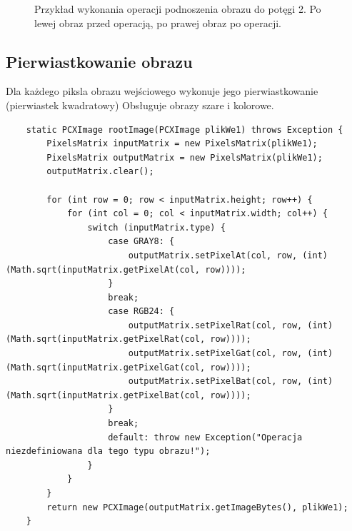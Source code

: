\documentclass{article}
\begin{document}
\begin{figure}[!ht]
	\caption{Przykład wykonania operacji podnoszenia obrazu do potęgi 2. Po lewej obraz przed operacją, po prawej obraz po operacji.}
	\label{fig6}	
	\end{figure}
	
	
	\subsection{Pierwiastkowanie obrazu}
	Dla każdego piksla obrazu wejściowego wykonuje jego pierwiastkowanie (pierwiastek kwadratowy)
	Obsługuje obrazy szare i kolorowe.
	
	\begin{verbatim}
	static PCXImage rootImage(PCXImage plikWe1) throws Exception {
        PixelsMatrix inputMatrix = new PixelsMatrix(plikWe1);
        PixelsMatrix outputMatrix = new PixelsMatrix(plikWe1);
        outputMatrix.clear();
        
        for (int row = 0; row < inputMatrix.height; row++) {
            for (int col = 0; col < inputMatrix.width; col++) {
                switch (inputMatrix.type) {
                    case GRAY8: {
                        outputMatrix.setPixelAt(col, row, (int) (Math.sqrt(inputMatrix.getPixelAt(col, row))));
                    }
                    break;
                    case RGB24: {
                        outputMatrix.setPixelRat(col, row, (int) (Math.sqrt(inputMatrix.getPixelRat(col, row))));
                        outputMatrix.setPixelGat(col, row, (int) (Math.sqrt(inputMatrix.getPixelGat(col, row))));
                        outputMatrix.setPixelBat(col, row, (int) (Math.sqrt(inputMatrix.getPixelBat(col, row))));
                    }
                    break;
                    default: throw new Exception("Operacja niezdefiniowana dla tego typu obrazu!");
                }
            }
        }
        return new PCXImage(outputMatrix.getImageBytes(), plikWe1);
    }
	\end{verbatim}
\end{document}
